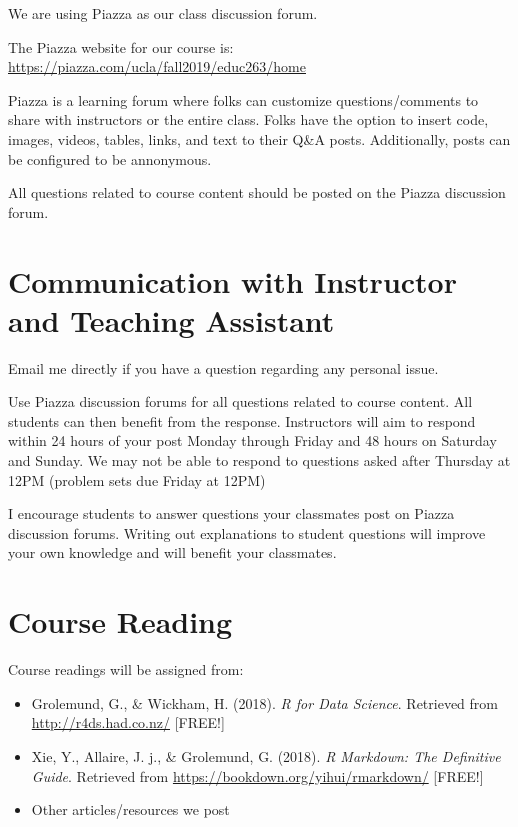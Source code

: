 \documentclass[11pt,]{article}
\providecommand{\tightlist}{%
  \setlength{\itemsep}{0pt}\setlength{\parskip}{0pt}}
\begin{document}
We are using Piazza as our class discussion forum.

The Piazza website for our course is:
\url{https://piazza.com/ucla/fall2019/educ263/home}

Piazza is a learning forum where folks can customize questions/comments
to share with instructors or the entire class. Folks have the option to
insert code, images, videos, tables, links, and text to their Q\&A
posts. Additionally, posts can be configured to be annonymous.

All questions related to course content should be posted on the Piazza
discussion forum.

\hypertarget{communication-with-instructor-and-teaching-assistant}{%
\section{Communication with Instructor and Teaching
Assistant}\label{communication-with-instructor-and-teaching-assistant}}

Email me directly if you have a question regarding any personal issue.

Use Piazza discussion forums for all questions related to course
content. All students can then benefit from the response. Instructors
will aim to respond within 24 hours of your post Monday through Friday
and 48 hours on Saturday and Sunday. We may not be able to respond to
questions asked after Thursday at 12PM (problem sets due Friday at 12PM)

I encourage students to answer questions your classmates post on Piazza
discussion forums. Writing out explanations to student questions will
improve your own knowledge and will benefit your classmates.

\hypertarget{course-reading}{%
\section{Course Reading}\label{course-reading}}

Course readings will be assigned from:

\begin{itemize}
\tightlist
\item
  Grolemund, G., \& Wickham, H. (2018). \emph{R for Data Science}.
  Retrieved from \url{http://r4ds.had.co.nz/} {[}FREE!{]}
\item
  Xie, Y., Allaire, J. j., \& Grolemund, G. (2018). \emph{R Markdown:
  The Definitive Guide}. Retrieved from
  \url{https://bookdown.org/yihui/rmarkdown/} {[}FREE!{]}
\item
  Other articles/resources we post
\end{itemize}
\end{document}

